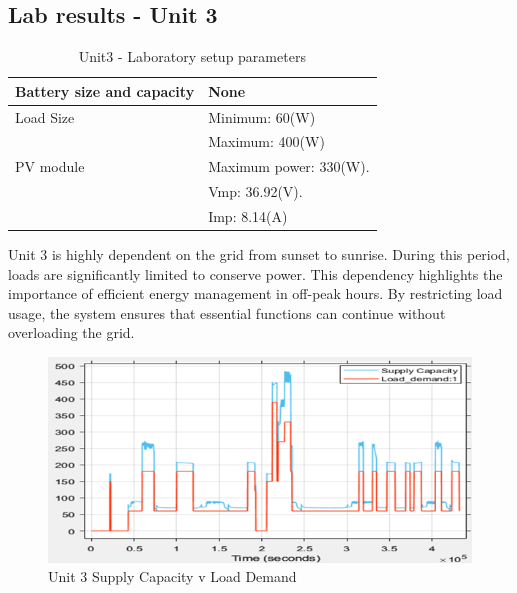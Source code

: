 \subsection{Lab results - Unit 3}
\begin{table}[!ht]
	\begin{center}
		\caption{Unit3 - Laboratory setup parameters}
		\begin{tabular}{|p{6cm}|p{8cm}|} %
			\hline
			Battery size and capacity	& None\\
			\hline
			Load Size 					& Minimum: 60(W)\\
			& Maximum: 400(W)\\
			\hline
			PV module		 			& Maximum power: 330(W).\\
										& Vmp: 36.92(V).\\
										& Imp: 8.14(A)\\
			\hline
		\end{tabular}
	\end{center}
\end{table}
Unit 3 is highly dependent on the grid from sunset to sunrise. During this period, loads are significantly limited to conserve power. This dependency highlights the importance of efficient energy management in off-peak hours. By restricting load usage, the system ensures that essential functions can continue without overloading the grid.\par

\begin{figure}[H]
	\centering
	\includegraphics[totalheight=6cm]{Figures/Unit 3 Supply Capacity v Load Demand.png}
	\caption{Unit 3 Supply Capacity v Load Demand}
\end{figure}

